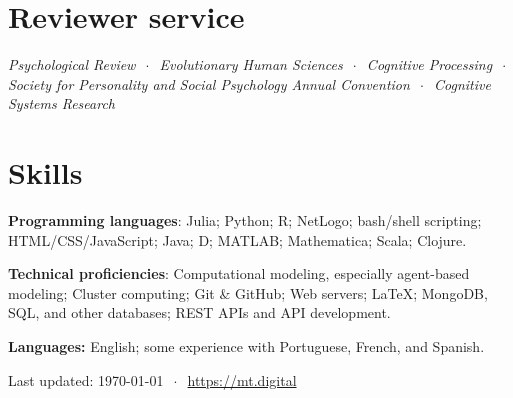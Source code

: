 \documentclass[11pt, letterpaper]{article}
\begin{document}
\section*{Reviewer service}

\emph{Psychological Review} $~\cdot~$ \emph{Evolutionary Human Sciences} $~\cdot~$ \emph{Cognitive Processing} $~\cdot~$ \emph{Society for Personality and Social Psychology Annual Convention} $~\cdot~$ \emph{Cognitive Systems Research}

\section*{Skills}

  \textbf{Programming languages}: Julia; Python; R; NetLogo; bash/shell scripting; 
  HTML/CSS/JavaScript; Java; D; MATLAB; Mathematica; Scala; Clojure.

  \textbf{Technical proficiencies}: Computational 
  modeling, especially agent-based modeling; Cluster computing;
  Git \& GitHub; Web servers; \LaTeX; MongoDB, SQL, and other databases; 
  REST APIs and API development.

  \textbf{Languages:} English; some experience with Portuguese, French,
  and Spanish.

\vfill
\hrulefill

\begin{center}
  {\scriptsize  Last updated: \today\- $~\cdot~$ \- 
\href{mt.digital}{https://mt.digital}}
\end{center}
\end{document}
